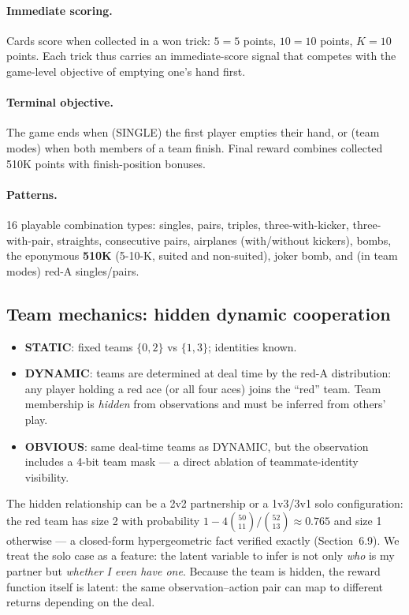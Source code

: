 \documentclass{article}
\begin{document}
\paragraph{Immediate scoring.} Cards score when collected in a won trick:
$5 = 5$ points, $10 = 10$ points, $K = 10$ points. Each trick thus carries an
immediate-score signal that competes with the game-level objective of emptying
one's hand first.

\paragraph{Terminal objective.} The game ends when (SINGLE) the first player
empties their hand, or (team modes) when both members of a team finish. Final
reward combines collected 510K points with finish-position bonuses.

\paragraph{Patterns.} 16 playable combination types: singles, pairs, triples,
three-with-kicker, three-with-pair, straights, consecutive pairs, airplanes
(with/without kickers), bombs, the eponymous \textbf{510K} (5-10-K, suited and
non-suited), joker bomb, and (in team modes) red-A singles/pairs.

\subsection{Team mechanics: hidden dynamic cooperation}
\begin{itemize}
\item \textbf{STATIC}: fixed teams $\{0,2\}$ vs $\{1,3\}$; identities known.
\item \textbf{DYNAMIC}: teams are determined at deal time by the red-A
distribution: any player holding a red ace (or all four aces) joins the ``red''
team. Team membership is \emph{hidden} from observations and must be inferred
from others' play.
\item \textbf{OBVIOUS}: same deal-time teams as DYNAMIC, but the observation
includes a 4-bit team mask --- a direct ablation of teammate-identity
visibility.
\end{itemize}
The hidden relationship can be a 2v2 partnership or a 1v3/3v1 solo
configuration: the red team has size 2 with probability
$1 - 4\binom{50}{11}/\binom{52}{13} \approx 0.765$ and size 1 otherwise --- a
closed-form hypergeometric fact verified exactly (Section~6.9). We treat the
solo case as a feature: the latent variable to infer is not only \emph{who} is
my partner but \emph{whether I even have one}. Because the team is hidden, the
reward function itself is latent: the same observation--action pair can map to
different returns depending on the deal.
\end{document}
